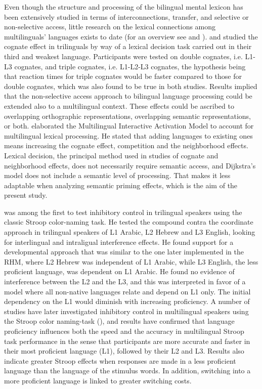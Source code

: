 \documentclass[output=paper,colorlinks,citecolor=brown,nonflat]{langsci/langscibook}
\begin{document}
Even though the structure and processing of the bilingual mental lexicon has been extensively studied in terms of interconnections, transfer, and selective or non-selective access, little research on the lexical connections among multilinguals’ languages exists to date (for an overview see \citealt{CenozEtAl2003} and \citealt{Szubko-Sitarek2015}). \citet{Szubko-Sitarek2011} and \citet{LemhöferEtAl2004} studied the cognate effect in trilinguals by way of a lexical decision task carried out in their third and weakest language. Participants were tested on double cognates, i.e. L1-L3 cognates, and triple cognates, i.e. L1-L2-L3 cognates, the hypothesis being that reaction times for triple cognates would be faster compared to those for double cognates, which was also found to be true in both studies. Results implied that the non-selective access approach to bilingual language processing could be extended also to a multilingual context. These effects could be ascribed to overlapping orthographic representations, overlapping semantic representations, or both. \citet{Dijkstra2003} elaborated the Multilingual Interactive Activation Model to account for multilingual lexical processing. He stated that adding languages to existing ones means increasing the cognate effect, competition and the neighborhood effects. Lexical decision, the principal method used in studies of cognate and neighborhood effects, does not necessarily require semantic access, and Dijkstra’s model does not include a semantic level of processing. That makes it less adaptable when analyzing semantic priming effects, which is the aim of the present study.

\citet{Abunuwara1992} was among the first to test inhibitory control in trilingual speakers using the classic Stroop color-naming task. He tested the compound contra the coordinate approach in trilingual speakers of L1 Arabic, L2 Hebrew and L3 English, looking for interlingual and intraligual interference effects. He found support for a developmental approach that was similar to the one later implemented in the RHM, where L2 Hebrew was independent of L1 Arabic, while L3 English, the less proficient language, was dependent on L1 Arabic. He found no evidence of interference between the L2 and the L3, and this was interpreted in favor of a model where all non-native languages relate and depend on L1 only. The initial dependency on the L1 would diminish with increasing proficiency. A number of studies have later investigated inhibitory control in multilingual speakers using the Stroop color naming-task (\citealt{SchwieterSunderman2011, LinckEtAl2012, MarianEtAl2013}), and results have confirmed that language proficiency influences both the speed and the accuracy in multilingual Stroop task performance in the sense that participants are more accurate and faster in their most proficient language (L1), followed by their L2 and L3. Results also indicate greater Stroop effects when responses are made in a less proficient language than the language of the stimulus words. In addition, switching into a more proficient language is linked to greater switching costs.
\end{document}
